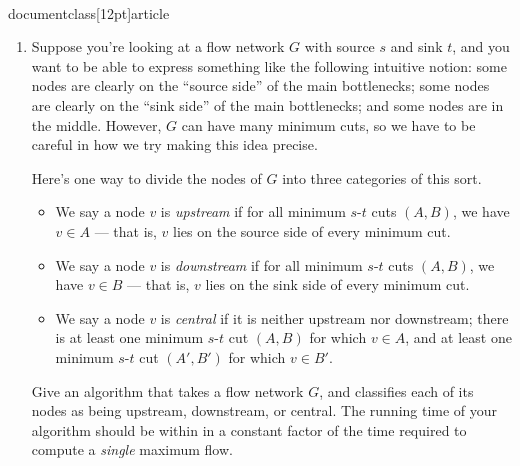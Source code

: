 \\documentclass[12pt]{article}
\begin{document}
\begin{enumerate}
{}



\item 

Suppose you're looking at a flow network $G$
with source $s$ and sink $t$, and
you want to be able to express something like the following
intuitive notion: some nodes are clearly on the ``source side''
of the main bottlenecks; some nodes are clearly on the ``sink side''
of the main bottlenecks; and some nodes are in the middle.
However, $G$ can have many minimum cuts, so we have
to be careful in how we try making this idea precise.

Here's one way to divide the nodes of $G$ into three
categories of this sort.
\begin{itemize}
\item We say a node $v$ is
{\em upstream} if for all minimum $s$-$t$ cuts $(A,B)$, we have
$v \in A$ --- that is, $v$ lies on the source side of every minimum cut.
\item We say a node $v$ is
{\em downstream} if for all minimum $s$-$t$ cuts $(A,B)$, we have
$v \in B$ --- that is, $v$ lies on the sink side of every minimum cut.
\item We say a node $v$ is
{\em central} if it is neither upstream nor downstream;
there is at least one minimum $s$-$t$ cut $(A,B)$ for which $v \in A$,
and at least one minimum $s$-$t$ cut $(A',B')$ for which $v \in B'$.
\end{itemize}

Give an algorithm that takes a flow network $G$, and
classifies each of its nodes as being upstream, downstream, or central.
The running time of your algorithm should be within in a constant
factor of the time required to compute a {\em single} maximum flow.

\end{enumerate}
\end{document}
